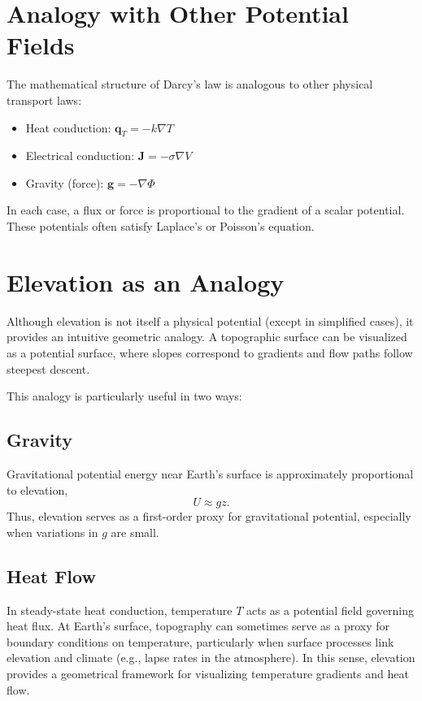 \documentclass[11pt]{article}
\begin{document}
\section{Analogy with Other Potential Fields}

The mathematical structure of Darcy's law is analogous to other physical transport laws:
\begin{itemize}
\item Heat conduction: $\mathbf{q}_T = -k \nabla T$
\item Electrical conduction: $\mathbf{J} = -\sigma \nabla V$
\item Gravity (force): $\mathbf{g} = -\nabla \Phi$
\end{itemize}

In each case, a flux or force is proportional to the gradient of a scalar potential. These potentials often satisfy Laplace's or Poisson's equation.

\section{Elevation as an Analogy}

Although elevation is not itself a physical potential (except in simplified cases), it provides an intuitive geometric analogy. A topographic surface can be visualized as a potential surface, where slopes correspond to gradients and flow paths follow steepest descent.

This analogy is particularly useful in two ways:

\subsection{Gravity}

Gravitational potential energy near Earth's surface is approximately proportional to elevation,
\begin{equation}
U \approx g z.
\end{equation}
Thus, elevation serves as a first-order proxy for gravitational potential, especially when variations in $g$ are small.

\subsection{Heat Flow}

In steady-state heat conduction, temperature $T$ acts as a potential field governing heat flux. At Earth's surface, topography can sometimes serve as a proxy for boundary conditions on temperature, particularly when surface processes link elevation and climate (e.g., lapse rates in the atmosphere). In this sense, elevation provides a geometrical framework for visualizing temperature gradients and heat flow.
\end{document}
